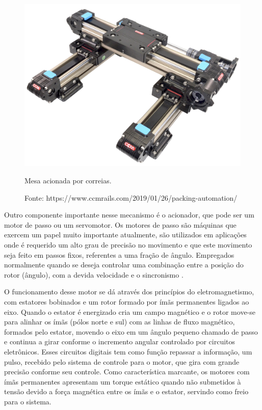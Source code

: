 \begin{figure}[!htb]
\centering
\includegraphics[scale = 0.065]{figuras/mcorreia}
\caption{Mesa acionada por correias.}
\caption*{Fonte: https://www.ccmrails.com/2019/01/26/packing-automation/}
\label{fig:mcorreia}
\end{figure}
    
Outro componente importante nesse mecanismo é o acionador, que pode ser um motor de passo ou um servomotor. 
Os motores de passo são máquinas que exercem um papel muito importante atualmente, são utilizados em 
aplicações onde é requerido um alto grau de precisão no movimento e que este movimento seja feito em passos 
fixos, referentes a uma fração de ângulo. Empregados normalmente quando se deseja controlar uma combinação 
entre a posição do rotor (ângulo), com a devida velocidade e o sincronismo \cite{silva2018maquinas}.

O funcionamento desse motor se dá através dos princípios do eletromagnetismo, com estatores bobinados e um rotor 
formado por ímãs permanentes ligados ao eixo. Quando o estator é energizado cria um campo magnético e o rotor 
move-se para alinhar os ímãs (pólos norte e sul) com as linhas de fluxo magnético, formados pelo estator, 
movendo o eixo em um ângulo pequeno chamado de passo e continua a girar conforme o incremento angular controlado 
por circuitos eletrônicos. Esses circuitos digitais tem como função repassar a informação, um pulso, recebido 
pelo sistema de controle para o motor, que gira com grande precisão conforme seu controle. Como característica 
marcante, os motores com ímãs permanentes apresentam um torque estático quando não submetidos à tensão devido 
a força magnética entre os ímãs e o estator, servindo como freio para o sistema.
 
